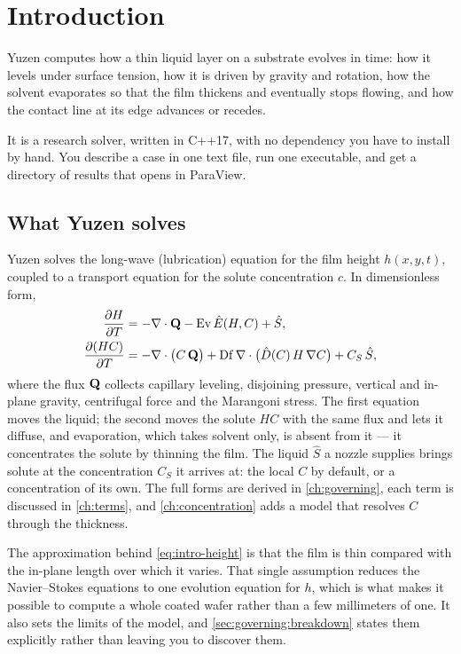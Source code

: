 \chapter{Introduction}
\label{ch:introduction}

Yuzen computes how a thin liquid layer on a substrate evolves in time: how it
levels under surface tension, how it is driven by gravity and rotation, how the
solvent evaporates so that the film thickens and eventually stops flowing, and
how the contact line at its edge advances or recedes.

It is a research solver, written in C++17, with no dependency you have to
install by hand. You describe a case in one text file, run one executable, and
get a directory of results that opens in ParaView.

\section{What Yuzen solves}
\label{sec:intro:what}

Yuzen solves the long-wave (lubrication) equation for the film height
$h(x,y,t)$, coupled to a transport equation for the solute concentration
$c$. In dimensionless form,
%
\begin{align}
  \frac{\partial H}{\partial T} &= -\nabla\cdot\mathbf{Q} - \mathrm{Ev}\,\hat{E}(H,C) + \hat{S},
  \label{eq:intro-height}\\
  \frac{\partial (HC)}{\partial T} &= -\nabla\cdot\bigl(C\,\mathbf{Q}\bigr)
    + \mathrm{Df}\,\nabla\cdot\bigl(\hat{D}(C)\,H\,\nabla C\bigr) + C_S\,\hat{S},
  \label{eq:intro-conc}
\end{align}
%
where the flux $\mathbf{Q}$ collects capillary leveling, disjoining pressure,
vertical and in-plane gravity, centrifugal force and the Marangoni stress.
The first equation moves the liquid; the second moves the solute $HC$ with the
same flux and lets it diffuse, and evaporation, which takes solvent only, is
absent from it --- it concentrates the solute by thinning the film. The liquid
$\hat{S}$ a nozzle supplies brings solute at the concentration $C_S$ it
arrives at: the local $C$ by default, or a concentration of its own. The full
forms are derived in \cref{ch:governing}, each term is discussed in
\cref{ch:terms}, and \cref{ch:concentration} adds a model that resolves $C$
through the thickness.

The approximation behind \cref{eq:intro-height} is that the film is thin
compared with the in-plane length over which it varies. That single assumption
reduces the Navier--Stokes equations to one evolution equation for $h$, which
is what makes it possible to compute a whole coated wafer rather than a few
millimeters of one. It also sets the limits of the model, and
\cref{sec:governing:breakdown} states them explicitly rather than leaving you
to discover them.

